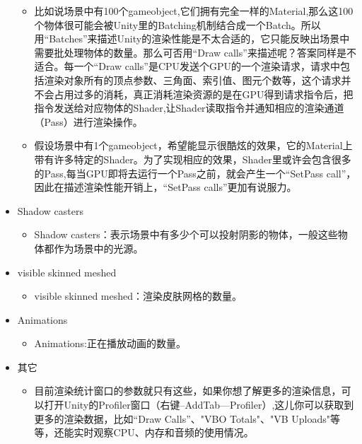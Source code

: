 \documentclass[9pt, b5paper]{article}
\begin{document}
\begin{itemize}
\begin{itemize}
\item 比如说场景中有100个gameobject,它们拥有完全一样的Material,那么这100个物体很可能会被Unity里的Batching机制结合成一个Batch。所以用“Batches”来描述Unity的渲染性能是不太合适的，它只能反映出场景中需要批处理物体的数量。那么可否用“Draw calls”来描述呢？答案同样是不适合。每一个“Draw calls”是CPU发送个GPU的一个渲染请求，请求中包括渲染对象所有的顶点参数、三角面、索引值、图元个数等，这个请求并不会占用过多的消耗，真正消耗渲染资源的是在GPU得到请求指令后，把指令发送给对应物体的Shader,让Shader读取指令并通知相应的渲染通道（Pass）进行渲染操作。
\item 假设场景中有1个gameobject，希望能显示很酷炫的效果，它的Material上带有许多特定的Shader。为了实现相应的效果，Shader里或许会包含很多的Pass,每当GPU即将去运行一个Pass之前，就会产生一个“SetPass call”，因此在描述渲染性能开销上，“SetPass calls”更加有说服力。
\end{itemize}
\item Shadow casters
\begin{itemize}
\item Shadow casters：表示场景中有多少个可以投射阴影的物体，一般这些物体都作为场景中的光源。
\end{itemize}
\item visible skinned  meshed
\begin{itemize}
\item visible skinned  meshed：渲染皮肤网格的数量。
\end{itemize}
\item Animations
\begin{itemize}
\item Animations:正在播放动画的数量。
\end{itemize}
\item 其它
\begin{itemize}
\item 目前渲染统计窗口的参数就只有这些，如果你想了解更多的渲染信息，可以打开Unity的Profiler窗口（右键--AddTab---Profiler）,这儿你可以获取到更多的渲染数据，比如“Draw Calls”、"VBO Totals"、"VB Uploads"等等，还能实时观察CPU、内存和音频的使用情况。
\end{itemize}
\end{itemize}
\end{document}
